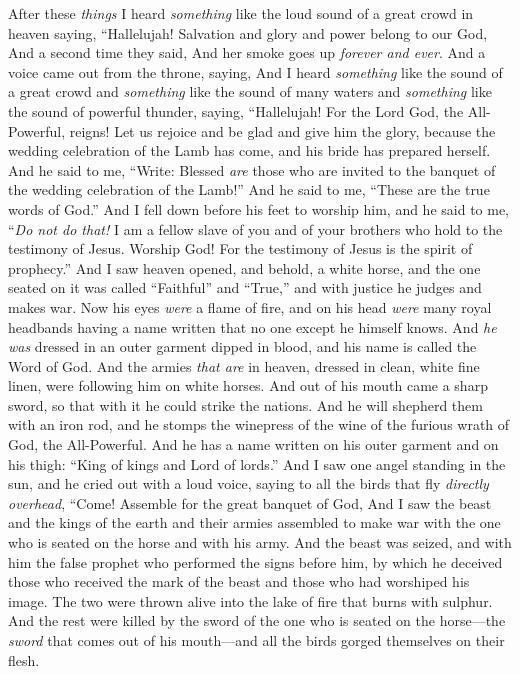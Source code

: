 \begin{biblechapter} %
 After these \textit{things} I heard \textit{something} like the loud sound of a great crowd in heaven saying,
\verse “Hallelujah! 
Salvation and glory and power belong to our God,
\verse And a second time they said,
\verse And her smoke goes up \textit{forever and ever}.
\verse And a voice came out from the throne, saying,
 And I heard \textit{something} like the sound of a great crowd and \textit{something} like the sound of many waters and \textit{something} like the sound of powerful thunder, saying,
\verse “Hallelujah! 
For the Lord God, the All-Powerful, reigns!
\verse Let us rejoice and be glad 
and give him the glory, 
because the wedding celebration of the Lamb has come, 
and his bride has prepared herself.
\verse And he said to me, “Write: Blessed \textit{are} those who are invited to the banquet of the wedding celebration of the Lamb!” And he said to me, “These are the true words of God.”
\verse And I fell down before his feet to worship him, and he said to me, “\textit{Do not do that!} I am a fellow slave of you and of your brothers who hold to the testimony of Jesus. Worship God! For the testimony of Jesus is the spirit of prophecy.”
 And I saw heaven opened, and behold, a white horse, and the one seated on it was called “Faithful” and “True,” and with justice he judges and makes war.
\verse Now his eyes \textit{were} a flame of fire, and on his head \textit{were} many royal headbands having a name written that no one except he himself knows.
\verse And \textit{he was} dressed in an outer garment dipped in blood, and his name is called the Word of God.
\verse And the armies \textit{that are} in heaven, dressed in clean, white fine linen, were following him on white horses.
\verse And out of his mouth came a sharp sword, so that with it he could strike the nations. And he will shepherd them with an iron rod, and he stomps the winepress of the wine of the furious wrath of God, the All-Powerful.
\verse And he has a name written on his outer garment and on his thigh: “King of kings and Lord of lords.”
\verse And I saw one angel standing in the sun, and he cried out with a loud voice, saying to all the birds that fly \textit{directly overhead},
\verse “Come! Assemble for the great banquet of God,
\verse And I saw the beast and the kings of the earth and their armies assembled to make war with the one who is seated on the horse and with his army.
\verse And the beast was seized, and with him the false prophet who performed the signs before him, by which he deceived those who received the mark of the beast and those who had worshiped his image. The two were thrown alive into the lake of fire that burns with sulphur.
\verse And the rest were killed by the sword of the one who is seated on the horse—the \textit{sword} that comes out of his mouth—and all the birds gorged themselves on their flesh.
\end{biblechapter}

